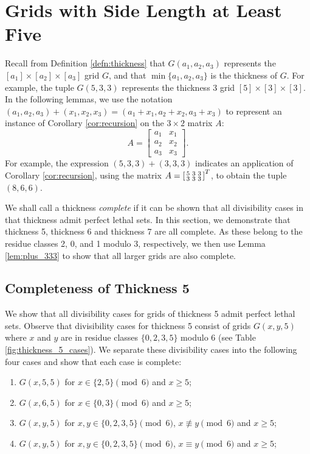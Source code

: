 \chapter{Grids with Side Length at Least Five}

Recall from Definition \ref{defn:thickness} that $G(a_1,a_2,a_3)$ represents the $[a_1] \times [a_2] \times [a_3]$ grid $G$, and that $\min\{a_1,a_2,a_3\}$ is the thickness of $G$. For example, the tuple $G(5,3,3)$ represents the thickness 3 grid $[5] \times [3] \times [3]$. In the following lemmas, we use the notation $(a_1,a_2,a_3)+(x_1,x_2,x_3) = (a_1+x_1, a_2+x_2, a_3+x_3)$ to represent an instance of Corollary \ref{cor:recursion} on the $3 \times 2$ matrix $A$:
$$A =
\begin{bmatrix}
a_1 & x_1 \\
a_2 & x_2 \\
a_3 & x_3
\end{bmatrix}.
$$
For example, the expression $(5,3,3) + (3,3,3)$ indicates an application of Corollary \ref{cor:recursion}, using the matrix $A = \begin{bsmallmatrix} 5&3&3 \\ 3&3&3 \end{bsmallmatrix}^T$, to obtain the tuple $(8,6,6)$. 

We shall call a thickness \emph{complete} if it can be shown that all divisibility cases in that thickness admit perfect lethal sets. In this section, we demonstrate that thickness 5, thickness 6 and thickness 7 are all complete. As these belong to the residue classes 2, 0, and 1 modulo 3, respectively, we then use Lemma \ref{lem:plus_333} to show that all larger grids are also complete. 

\section{Completeness of Thickness 5}
We show that all divisibility cases for grids of thickness 5 admit perfect lethal sets. Observe that divisibility cases for thickness 5 consist of grids $G(x,y,5)$ where $x$ and $y$ are in residue classes $\{0,2,3,5\}$ modulo 6 (see Table \ref{fig:thickness_5_cases}). We separate these divisibility cases into the following four cases and show that each case is complete:

\begin{enumerate}
\item $G(x,5,5)$ for $x \in \{2,5\} \pmod 6$ and $x \geq 5$;
\item $G(x,6,5)$ for $x \in \{0,3\} \pmod 6$ and $x \geq 5$;
\item $G(x,y,5)$ for $x,y \in \{0,2,3,5\} \pmod 6$, $x \not\equiv y \pmod 6$ and $x \geq 5$;
\item $G(x,y,5)$ for $x,y \in \{0,2,3,5\} \pmod 6$, $x \equiv y \pmod 6$ and $x \geq 5$;
\end{enumerate}

